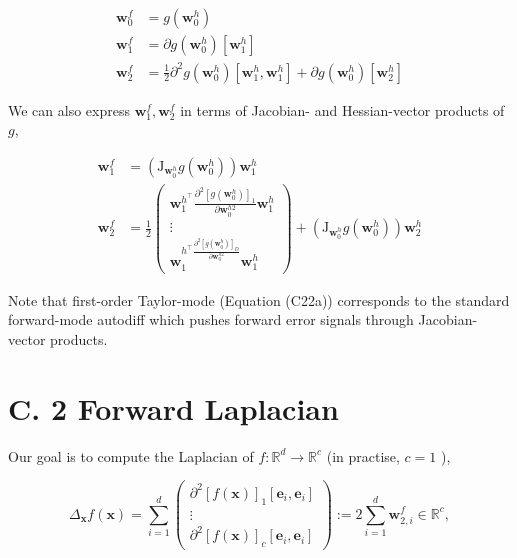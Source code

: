 \documentclass[10pt]{article}
\begin{document}
\begin{align*}
\boldsymbol{w}_{0}^{f} & =g\left(\boldsymbol{w}_{0}^{h}\right)  \tag{C21a}\\
\boldsymbol{w}_{1}^{f} & =\partial g\left(\boldsymbol{w}_{0}^{h}\right)\left[\boldsymbol{w}_{1}^{h}\right]  \tag{C21b}\\
\boldsymbol{w}_{2}^{f} & =\frac{1}{2} \partial^{2} g\left(\boldsymbol{w}_{0}^{h}\right)\left[\boldsymbol{w}_{1}^{h}, \boldsymbol{w}_{1}^{h}\right]+\partial g\left(\boldsymbol{w}_{0}^{h}\right)\left[\boldsymbol{w}_{2}^{h}\right] \tag{C21c}
\end{align*}


We can also express $\boldsymbol{w}_{1}^{f}, \boldsymbol{w}_{2}^{f}$ in terms of Jacobian- and Hessian-vector products of $g$,


\begin{align*}
\boldsymbol{w}_{1}^{f} & =\left(\mathrm{J}_{\boldsymbol{w}_{0}^{h}} g\left(\boldsymbol{w}_{0}^{h}\right)\right) \boldsymbol{w}_{1}^{h}  \tag{C22a}\\
\boldsymbol{w}_{2}^{f} & =\frac{1}{2}\left(\begin{array}{c}
\boldsymbol{w}_{1}^{h^{\top}} \frac{\partial^{2}\left[g\left(\boldsymbol{w}_{0}^{h}\right)\right]_{1}}{\partial \boldsymbol{w}_{0}^{h 2}} \boldsymbol{w}_{1}^{h} \\
\vdots \\
\boldsymbol{w}_{1}^{h^{\top} \frac{\partial^{2}\left[g\left(\boldsymbol{w}_{0}^{h}\right)\right]_{D}}{\partial \boldsymbol{w}_{0}^{h 2}}} \boldsymbol{w}_{1}^{h}
\end{array}\right)+\left(\mathrm{J}_{\boldsymbol{w}_{0}^{h}} g\left(\boldsymbol{w}_{0}^{h}\right)\right) \boldsymbol{w}_{2}^{h} \tag{C22b}
\end{align*}


Note that first-order Taylor-mode (Equation (C22a)) corresponds to the standard forward-mode autodiff which pushes forward error signals through Jacobian-vector products.

\section*{C. 2 Forward Laplacian}
Our goal is to compute the Laplacian of $f: \mathbb{R}^{d} \rightarrow \mathbb{R}^{c}$ (in practise, $c=1$ ),

\[
\Delta_{\boldsymbol{x}} f(\boldsymbol{x})=\sum_{i=1}^{d}\left(\begin{array}{c}
\partial^{2}[f(\boldsymbol{x})]_{1}\left[\boldsymbol{e}_{i}, \boldsymbol{e}_{i}\right]  \tag{C23}\\
\vdots \\
\partial^{2}[f(\boldsymbol{x})]_{c}\left[\boldsymbol{e}_{i}, \boldsymbol{e}_{i}\right]
\end{array}\right):=2 \sum_{i=1}^{d} \boldsymbol{w}_{2, i}^{f} \in \mathbb{R}^{c},
\]
\end{document}
